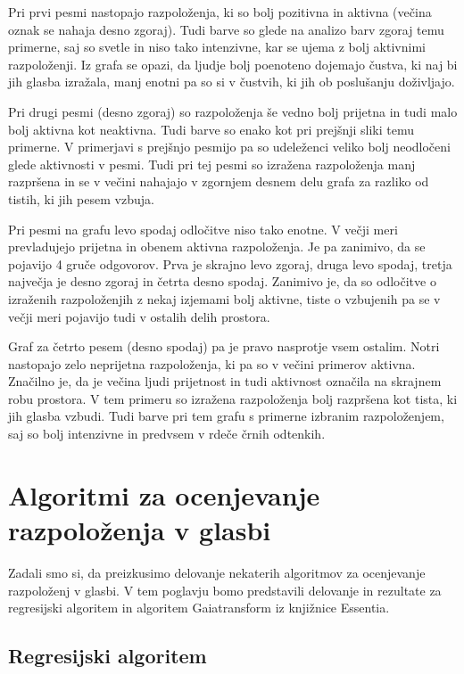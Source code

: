\documentclass[a4paper, 12pt]{book}
\begin{document}
{Pri prvi pesmi nastopajo razpoloženja, ki so bolj pozitivna in aktivna (večina oznak se nahaja desno zgoraj). Tudi barve so glede na analizo barv zgoraj temu primerne, saj so svetle in niso tako intenzivne, kar se ujema z bolj aktivnimi razpoloženji. Iz grafa se opazi, da ljudje bolj poenoteno dojemajo čustva, ki naj bi jih glasba izražala, manj enotni pa so si v čustvih, ki jih ob poslušanju doživljajo. 

Pri drugi pesmi (desno zgoraj) so razpoloženja še vedno bolj prijetna in tudi malo bolj aktivna kot neaktivna. Tudi barve so enako kot pri prejšnji sliki temu primerne. V primerjavi s prejšnjo pesmijo pa so udeleženci veliko bolj neodločeni glede aktivnosti v pesmi. Tudi pri tej pesmi so izražena razpoloženja manj razpršena in se v večini nahajajo v zgornjem desnem delu grafa za razliko od tistih, ki jih pesem vzbuja. 

Pri pesmi na grafu levo spodaj odločitve niso tako enotne. V večji meri prevladujejo prijetna in obenem aktivna razpoloženja. Je pa zanimivo, da se pojavijo 4 gruče odgovorov. Prva je skrajno levo zgoraj, druga levo spodaj, tretja največja je desno zgoraj in četrta desno spodaj. Zanimivo je, da so odločitve o izraženih razpoloženjih z nekaj izjemami bolj aktivne, tiste o vzbujenih pa se v večji meri pojavijo tudi v ostalih delih prostora. 

Graf za četrto pesem (desno spodaj) pa je pravo nasprotje vsem ostalim. Notri nastopajo zelo neprijetna razpoloženja, ki pa so v večini primerov aktivna. Značilno je, da je večina ljudi prijetnost in tudi aktivnost označila na skrajnem robu prostora. V tem primeru so izražena razpoloženja bolj razpršena kot tista, ki jih glasba vzbudi. Tudi barve pri tem grafu s primerne izbranim razpoloženjem, saj so bolj intenzivne in predvsem v rdeče črnih odtenkih. 

\chapter{Algoritmi za ocenjevanje razpoloženja v glasbi}

Zadali smo si, da preizkusimo delovanje nekaterih algoritmov za ocenjevanje razpoloženj v glasbi. V tem poglavju bomo predstavili delovanje in rezultate za regresijski algoritem in algoritem Gaiatransform iz knjižnice Essentia.

\section{Regresijski algoritem}
\label{regresijsialg}

}
\end{document}
